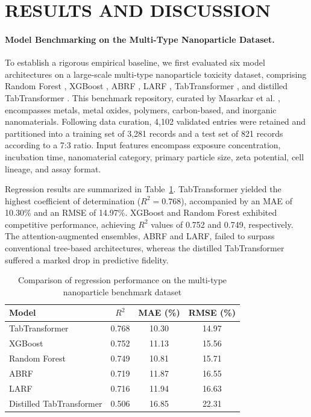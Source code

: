 \section{RESULTS AND DISCUSSION}

\paragraph{Model Benchmarking on the Multi-Type Nanoparticle Dataset.}
To establish a rigorous empirical baseline, we first evaluated six model architectures on a large-scale multi-type nanoparticle toxicity dataset, comprising Random Forest \cite{breiman2001random}, XGBoost \cite{chen2016xgboost}, ABRF \cite{gromov2022attention}, LARF \cite{gromov2022larf}, TabTransformer \cite{huang2020tabtransformer}, and distilled TabTransformer \cite{hinton2015distilling}. This benchmark repository, curated by Masarkar et al. \cite{masarkar2024}, encompasses metals, metal oxides, polymers, carbon-based, and inorganic nanomaterials. Following data curation, 4,102 validated entries were retained and partitioned into a training set of 3,281 records and a test set of 821 records according to a 7:3 ratio. Input features encompass exposure concentration, incubation time, nanomaterial category, primary particle size, zeta potential, cell lineage, and assay format.

Regression results are summarized in Table~\ref{tab:benchmark_regression}. TabTransformer yielded the highest coefficient of determination ($R^2 = 0.768$), accompanied by an MAE of 10.30\% and an RMSE of 14.97\%. XGBoost and Random Forest exhibited competitive performance, achieving $R^2$ values of 0.752 and 0.749, respectively. The attention-augmented ensembles, ABRF and LARF, failed to surpass conventional tree-based architectures, whereas the distilled TabTransformer suffered a marked drop in predictive fidelity.

\begin{table}[htbp]
  \centering
  \caption{Comparison of regression performance on the multi-type nanoparticle benchmark dataset}
  \label{tab:benchmark_regression}
  \begin{tabular}{lccc}
    \hline
    Model & $R^2$ & MAE (\%) & RMSE (\%) \\
    \hline
    TabTransformer & 0.768 & 10.30 & 14.97 \\
    XGBoost & 0.752 & 11.13 & 15.56 \\
    Random Forest & 0.749 & 10.81 & 15.71 \\
    ABRF & 0.719 & 11.87 & 16.55 \\
    LARF & 0.716 & 11.94 & 16.63 \\
    Distilled TabTransformer & 0.506 & 16.85 & 22.31 \\
    \hline
  \end{tabular}
\end{table}

